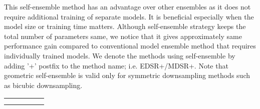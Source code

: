 \documentclass[10pt,twocolumn,letterpaper]{article}
\begin{document}
	This self-ensemble method has an advantage over other ensembles as it does not require additional training of separate models. It is beneficial especially when the model size or training time matters. Although self-ensemble strategy keeps the total number of parameters same, we notice that it gives approximately same performance gain compared to conventional model ensemble method that requires individually trained models. We denote the methods using self-ensemble by adding '+' postfix to the method name; i.e. EDSR+/MDSR+. Note that geometric self-ensemble is valid only for symmetric downsampling methods such as bicubic downsampling. 
	
\begin{figure*}[t]
		\captionsetup[subfloat]{labelformat=empty}
		\begin{center}
			\newcommand{\rowArg}{2.6cm}
			\newcommand{\fullSize}{5.85cm}
			\newcommand{\patchSize}{2.45cm}
			\scriptsize
			\setlength\tabcolsep{0.1cm}
			\begin{tabular}[b]{c c c c c}
				\multirow{2}{*}[\rowArg]{
					\subfloat[img034 from Urban100~\cite{huang2015single}]
					{\includegraphics[width = \fullSize, height = \fullSize]
						{figs/Urban100_img034_Full_cut.png}}} &
				\subfloat[HR \protect\linebreak(PSNR / SSIM)]
				{\includegraphics[width = \patchSize, height = \patchSize]
					{figs/Urban100_img034_GT.png}} &
				\subfloat[Bicubic \protect\linebreak(21.41 dB / 0.4810)]
				{\includegraphics[width = \patchSize, height = \patchSize]
					{figs/Urban100_img034_Bicubic.png}} &
				\subfloat[A+ \cite{timofte2014a+} \protect\linebreak(22.21 dB / 0.5408)]
				{\includegraphics[width = \patchSize, height = \patchSize]
					{figs/Urban100_img034_Aplus.png}} &
				\subfloat[SRCNN \cite{dong2014learning} \protect\linebreak(22.33 dB / 0.5461)]
				{\includegraphics[width = \patchSize, height = \patchSize]
					{figs/Urban100_img034_SRCNN.png}} \\ [-0.2cm] &
				\subfloat[VDSR \cite{kim2016accurate} \protect\linebreak(22.62 dB / 0.5657)]
				{\includegraphics[width = \patchSize, height = \patchSize]
					{figs/Urban100_img034_VDSR.png}} &
				\subfloat[SRResNet \cite{ledig2016photo} \protect\linebreak(23.14 dB / 0.5891)]
				{\includegraphics[width = \patchSize, height = \patchSize]
					{figs/Urban100_img034_SRResNet_reproduce.png}} &
				\subfloat[\textbf{EDSR+ (Ours)} \protect\linebreak(\textcolor{red}{23.48 dB} / \textcolor{red}{0.6048})]
				{\includegraphics[width = \patchSize, height = \patchSize]
					{figs/Urban100_img034_Ours_Single.png}} &
				\subfloat[\textbf{MDSR+ (Ours)} \protect\linebreak(\textcolor{blue}{23.46 dB} / \textcolor{blue}{0.6039})]
				{\includegraphics[width = \patchSize, height = \patchSize]
					{figs/Urban100_img034_Ours_Multi.png}} \\
				

\end{tabular}
\end{center}
\end{figure*}
\end{document}
